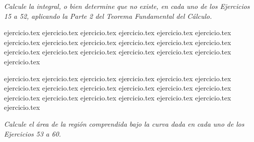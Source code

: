 \vspace{1em}
\noindent \textit{Calcule la integral, o bien determine que no existe, en cada uno de los Ejercicios 15 a 52, aplicando la Parte 2 del Teorema Fundamental del Cálculo.}

\begin{enumerate}
    \setcounter{enumi}{14}
    \begin{minipage}{0.45\textwidth}
    {ejercicio.tex}
    {ejercicio.tex}
    {ejercicio.tex}
    {ejercicio.tex}
    {ejercicio.tex}
    {ejercicio.tex}
    {ejercicio.tex}
    {ejercicio.tex}
    {ejercicio.tex}
    {ejercicio.tex}
    {ejercicio.tex}
    {ejercicio.tex}
    {ejercicio.tex}
    {ejercicio.tex}
    {ejercicio.tex}
    {ejercicio.tex}
    {ejercicio.tex}
    {ejercicio.tex}
    {ejercicio.tex}
    \end{minipage}%
    \begin{minipage}{0.45\textwidth}
    {ejercicio.tex}
    {ejercicio.tex}
    {ejercicio.tex}
    {ejercicio.tex}
    {ejercicio.tex}
    {ejercicio.tex}
    {ejercicio.tex}
    {ejercicio.tex}
    {ejercicio.tex}
    {ejercicio.tex}
    {ejercicio.tex}
    {ejercicio.tex}
    {ejercicio.tex}
    {ejercicio.tex}
    {ejercicio.tex}
    {ejercicio.tex}
    {ejercicio.tex}
    {ejercicio.tex}
    {ejercicio.tex}
    \end{minipage}
\end{enumerate}

\vspace{1em}
\noindent \textit{Calcule el área de la región comprendida bajo la curva dada en cada uno de los Ejercicios 53 a 60.}

